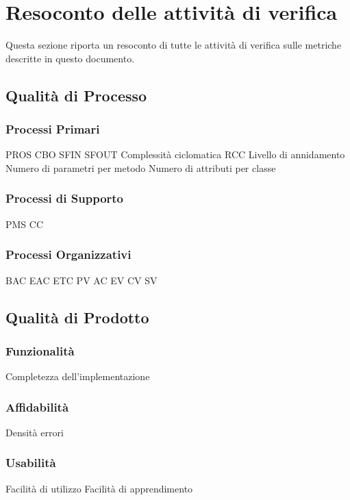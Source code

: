 \section{Resoconto delle attività di verifica}
	Questa sezione riporta un resoconto di tutte le attività di verifica sulle metriche descritte in questo documento.

	\subsection{Qualità di Processo}
		\subsubsection{Processi Primari}
				PROS
				CBO		%
				SFIN
				SFOUT
				Complessità ciclomatica
				RCC
				Livello di annidamento
				Numero di parametri per metodo
				Numero di attributi per classe
			
		\subsubsection{Processi di Supporto}
				
				PMS		%
				CC	%
				
		\subsubsection{Processi Organizzativi}
				BAC	%
				EAC
				ETC
				PV
				AC
				EV
				CV
				SV
			
	
	\subsection{Qualità di Prodotto}
		\subsubsection{Funzionalità}
			Completezza dell'implementazione	%
		\subsubsection{Affidabilità}
			Densità errori	%
		\subsubsection{Usabilità}
			Facilità di utilizzo	%
			Facilità di apprendimento
